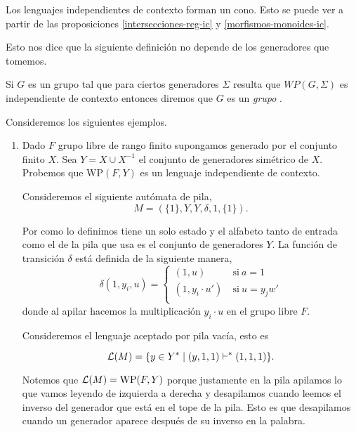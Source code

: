 \documentclass[tesis.tex]{subfiles}
\begin{document}
\begin{ej}\label{ic-cono}
	Los lenguajes independientes de contexto forman un cono.
	Esto se puede ver a partir de las proposiciones  \ref{intersecciones-reg-ic} y \ref{morfismos-monoides-ic}.
\end{ej}

Esto nos dice que la siguiente definición no depende de los generadores que tomemos.

\begin{deff}
	Si $G$ es un grupo \fg tal que para ciertos generadores $\Sigma$ resulta que $WP(G, \Sigma)$ es independiente de contexto entonces diremos que $G$ es un \emph{grupo \ic }.
\end{deff}


\begin{ej} Consideremos los siguientes ejemplos.	
	\begin{enumerate}[E1.]
		\item 
		Dado $F$ grupo libre de rango finito supongamos generado por el conjunto finito $X$. 
		Sea  $Y = X \cup X^{-1}$ el conjunto de generadores simétrico de $X$. 
		Probemos que $\text{WP}(F,Y)$ es un lenguaje independiente de contexto.
		
		Consideremos el siguiente autómata de pila,
		\[
		M = (\{ 1 \}, Y, Y, \delta, 1, \{1\}).
		\]
		
		Por como lo definimos tiene un solo estado y el alfabeto tanto de entrada como el de la pila que usa es el conjunto de generadores $Y$.
		La función de transición $\delta$ está definida de la siguiente manera,
		\[
		\delta(1, y_i, u)=\left\{
		\begin{array}{ll}
		(1 , u )  &\ \text{si} \ a = 1  \\
		(1, y_i \cdot u') &\ \text{si} \  u = y_jw'  \\
		\end{array}
		\right.
		\]
		donde al apilar hacemos la multiplicación $y_i \cdot u$ en el grupo libre $F$.
		
		Consideremos el lenguaje aceptado por pila vacía, esto es
		
		\[
		{\cal L }(M) = \{  y \in Y^* \mid (y,1,1)   \vdash^*  (1, 1, 1)  \}.
		\]
		
		Notemos que ${\cal L }(M) = \text{WP}(F,Y)$ porque justamente en la pila apilamos lo que vamos leyendo de izquierda a derecha y desapilamos cuando leemos el inverso del generador que está en el tope de la pila.
		Esto es que desapilamos cuando un generador aparece después de su inverso en la palabra.


\end{enumerate}
\end{ej}
\end{document}
